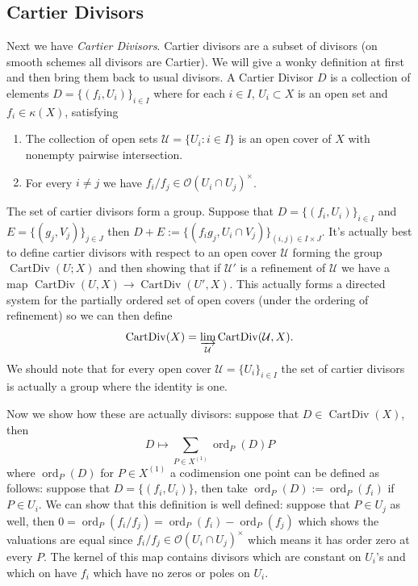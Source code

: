 \documentclass[12pt]{article}
\numberwithin{equation}{section}
\theoremstyle{definition}
\theoremstyle{remark}
\newcommand{\ord}{\operatorname{ord}}
\newcommand{\CartDiv}{\operatorname{CartDiv}}
\begin{document}
\subsection{Cartier Divisors}
Next we have \emph{Cartier Divisors}. Cartier divisors are a subset of divisors (on smooth schemes all divisors are Cartier). We will give a wonky definition at first and then bring them back to usual divisors. 
A Cartier Divisor $D$ is a collection of elements $D=\lbrace (f_i,U_i) \rbrace_{i\in I}$ where for each $i\in I$, $U_i\subset X$ is an open set and $f_i\in \kappa(X)$, satisfying
\begin{enumerate}
	\item The collection of open sets $\mathcal U = \lbrace U_i:i\in I\rbrace$ is an open cover of $X$ with nonempty pairwise intersection.
	\item For every $i\neq j$ we have $f_i/f_j\in \mathcal O(U_i\cap U_j)^{\times}$.
\end{enumerate}
The set of cartier divisors form a group. Suppose that $D = \lbrace (f_i,U_i)\rbrace_{i\in I}$ and $E = \lbrace (g_j,V_j)\rbrace_{j\in J}$ then $D+E:= \lbrace (f_ig_j,U_i\cap V_j)\rbrace_{(i,j)\in I\times J}$. It's actually best to define cartier divisors with respect to an open cover $\mathcal U$ forming the group $\CartDiv(U;X)$ and then showing that if $\mathcal U'$ is a refinement of $\mathcal U$ we have a map $\CartDiv(U,X)\to \CartDiv(U',X)$. This actually forms a directed system for the partially ordered set of open covers (under the ordering of refinement) so we can then define
$$\CartDiv(X) = \varinjlim_{\mathcal U} \CartDiv(\mathcal U,X).$$
We should note that for every open cover $\mathcal U = \lbrace U_i \rbrace_{i\in I}$ the set of cartier divisors is actually a group where the identity is one.

Now we show how these are actually divisors: suppose that $D\in \CartDiv(X)$, then 
\begin{equation} \label{eqn:cartier_to_weil}
D\mapsto\sum_{P\in X^{(1)}} \ord_P(D) P
\end{equation}
where $\ord_P(D)$ for $P \in X^{(1)}$ a codimension one point can be defined as follows: suppose that $D=\lbrace(f_i,U_i)\rbrace$, then take $\ord_P(D):= \ord_P(f_i)$ if $P\in U_i$. We can show that this definition is well defined: suppose that $P\in U_j$ as well, then 
$0=\ord_P(f_i/f_j)=\ord_P(f_i) - \ord_P(f_j)$
which shows the valuations are equal since $f_i/f_j\in \mathcal O(U_i\cap U_j)^{\times}$ which means it has order zero at every $P$. The kernel of this map contains divisors which are constant on $U_i$'s and which on have $f_i$ which have no zeros or poles on $U_i$.
\end{document}
